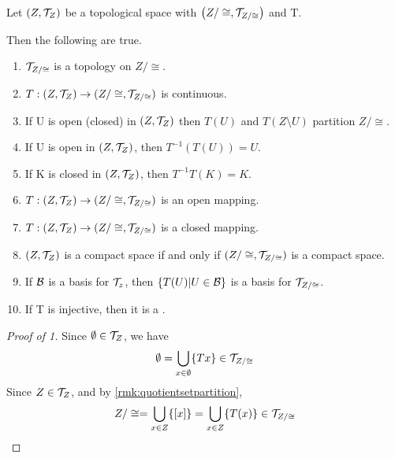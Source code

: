 
\begin{prop}
    \label{prop:QuotientSpaceTopology}
    
    Let $(Z,\mathcal{T}_Z)$ be a topological space 
    with \QuotientTopologicalSpace  $\left( Z/\cong, \mathcal{T}_{Z/\cong}\right)$
    and \QuotientMap T.
    
    Then the following are true. 
    \begin{enumerate}
        \item $\mathcal{T}_{Z/\cong}$ is a topology on $Z/\cong$. 
        \item $T:(Z, \mathcal{T}_Z) \to (Z/\cong, \mathcal{T}_{Z/\cong})$ is continuous. 
        \item If U is open (closed) in $(Z,\mathcal{T}_Z)$ then $T(U)$ and $T(Z\setminus U)$ partition $Z/\cong$. 
        \item If U is open in $(Z, \mathcal{T}_Z)$, then $T^{-1}(T(U))=U$. 
        \item If K is closed in $(Z,\mathcal{T}_Z)$, then $T^{-1}T(K)=K$. 
        \item $T:(Z, \mathcal{T}_Z) \to (Z/\cong, \mathcal{T}_{Z/\cong})$ is an open mapping. 
        \item $T:(Z, \mathcal{T}_Z) \to (Z/\cong, \mathcal{T}_{Z/\cong})$ is a  closed mapping.
        \item $(Z, \mathcal{T}_Z)$ is a compact space if and only if $(Z/\cong, \mathcal{T}_{Z/\cong})$ is a compact space.
        \item If $\mathcal{B}$ is a basis for $\mathcal{T}_z$, then $\{T(U) | U \in \mathcal{B}\}$ is a basis for $\mathcal{T}_{Z/\cong}$. 
        \item If T is injective, then it is a \Homeomorphism. 
    \end{enumerate} 
    \begin{proof}[Proof of 1]
        Since $\emptyset \in \mathcal{T}_Z$, we have 
        \begin{equation}
            \emptyset = \bigcup\limits_{x \in \emptyset} \{Tx\} \in \mathcal{T}_{Z/\cong}
        \end{equation}
        Since $Z \in \mathcal{T}_Z$, and by \ref{rmk:quotientsetpartition}, 
        \begin{equation} 
            Z/\cong = \bigcup_{x \in Z} \{[x]\}= \bigcup\limits_{x \in Z} \{T(x)\} \in \mathcal{T}_{Z/\cong}
        \end{equation} 
        

\end{proof}
\end{prop}
